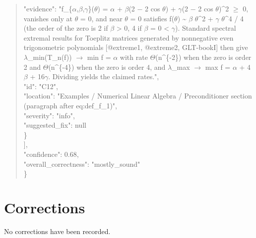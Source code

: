\documentclass[11pt]{article}
\begin{document}
\begin{quote}
      "evidence": "f\_\{\ensuremath{\alpha},\ensuremath{\beta},\ensuremath{\gamma}\}(\ensuremath{\theta}) = \ensuremath{\alpha} + \ensuremath{\beta}(2 \ensuremath{-} 2 cos \ensuremath{\theta}) + \ensuremath{\gamma}(2 \ensuremath{-} 2 cos \ensuremath{\theta})\^{}2 \ensuremath{\ge} 0, vanishes only at \ensuremath{\theta} = 0, and near \ensuremath{\theta} = 0 satisfies f(\ensuremath{\theta}) \~{} \ensuremath{\beta} \ensuremath{\theta}\^{}2 + \ensuremath{\gamma} \ensuremath{\theta}\^{}4 / 4 (the order of the zero is 2 if \ensuremath{\beta} > 0, 4 if \ensuremath{\beta} = 0 < \ensuremath{\gamma}). Standard spectral extremal results for Toeplitz matrices generated by nonnegative even trigonometric polynomials [@extreme1, @extreme2, GLT-bookI] then give \ensuremath{\lambda}\_min(T\_n(f)) \ensuremath{\to} min f = \ensuremath{\alpha} with rate \ensuremath{\Theta}(n\^{}\{-2\}) when the zero is order 2 and \ensuremath{\Theta}(n\^{}\{-4\}) when the zero is order 4, and \ensuremath{\lambda}\_max \ensuremath{\to} max f = \ensuremath{\alpha} + 4\ensuremath{\beta} + 16\ensuremath{\gamma}. Dividing yields the claimed rates.",\\
      "id": "C12",\\
      "location": "Examples / Numerical Linear Algebra / Preconditioner section (paragraph after eq:def\_f\_1)",\\
      "severity": "info",\\
      "suggested\_fix": null\\
    \}\\
  ],\\
  "confidence": 0.68,\\
  "overall\_correctness": "mostly\_sound"\\
\}\\
\end{quote}

\section*{Corrections}
No corrections have been recorded.
\end{document}
